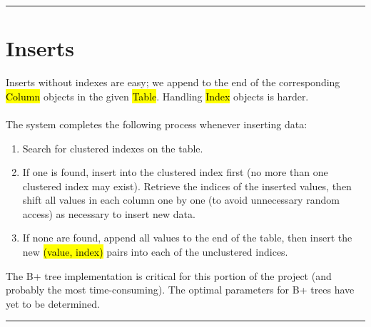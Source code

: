 \documentclass[paper=letter, fontsize=11pt]{scrartcl}
\numberwithin{equation}{section}
\numberwithin{figure}{section}
\numberwithin{table}{section}
\newcommand{\horrule}[1]{\rule{\linewidth}{#1}}
\newcommand{\ttt}[1]{\hl{\ttfamily #1}}
\begin{document}
\horrule{0.5pt} 
\section{Inserts}
Inserts without indexes are easy; we append to the end of the corresponding \ttt{Column} objects in the given \ttt{Table}.  Handling \ttt{Index} objects is harder.
\\\\The system completes the following process whenever inserting data:
\begin{enumerate}
\item Search for clustered indexes on the table.
\item If one is found, insert into the clustered index first (no more than one clustered index may exist).  Retrieve the indices of the inserted values, then shift all values in each column one by one (to avoid unnecessary random access) as necessary to insert new data.
\item If none are found, append all values to the end of the table, then insert the new \ttt{(value, index)} pairs into each of the unclustered indices.
\end{enumerate}

The B+ tree implementation is critical for this portion of the project (and probably the most time-consuming).  The optimal parameters for B+ trees have yet to be determined.

\begin{center}
\end{center}

\horrule{0.5pt}
\end{document}
